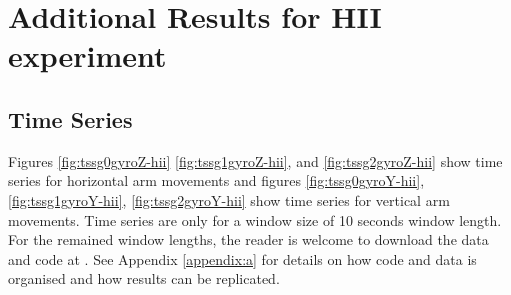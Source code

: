 \chapter{Additional Results for HII experiment} \label{appendix:e}


\graphicspath{{figs/appendixE/PDF/}}

\section{Time Series} \label{appendix:e:ts}
Figures \ref{fig:tssg0gyroZ-hii} \ref{fig:tssg1gyroZ-hii}, and \ref{fig:tssg2gyroZ-hii}
show time series for horizontal arm movements 
and figures \ref{fig:tssg0gyroY-hii}, \ref{fig:tssg1gyroY-hii},
\ref{fig:tssg2gyroY-hii}
show time series for vertical arm movements.
Time series are only for a window size of 10 seconds window length.
For the remained window lengths, 
the reader is welcome to download the data and code at \cite{xochicale2019}.
See Appendix \ref{appendix:a}
for details on how code and data 
is organised and how results can be replicated. 


